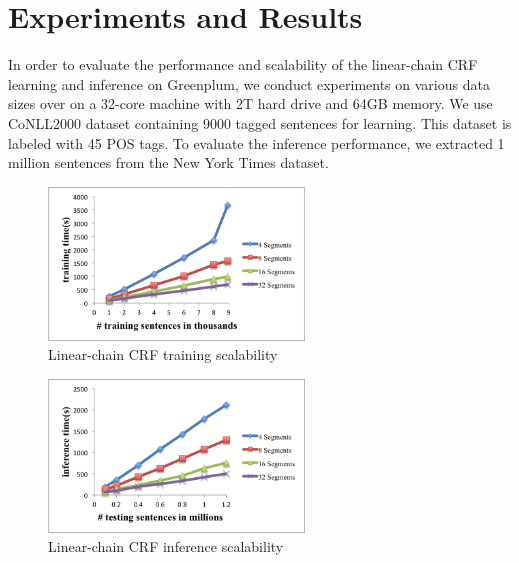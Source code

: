 \documentclass[11pt,letterpaper]{article}
\begin{document}




\section{Experiments and Results}
In order to evaluate the performance and scalability of the linear-chain CRF learning and inference on Greenplum,
we conduct experiments on various data sizes over on a 32-core machine with 2T hard drive and 64GB memory.
We use CoNLL2000 dataset containing 9000 tagged sentences for learning. 
This dataset is labeled with 45 POS tags.
To evaluate the inference performance, we extracted 1 million sentences from the New York Times dataset. 

\begin{figure}
\centering
\includegraphics[height=11em]{training}
\caption{Linear-chain CRF training scalability}
\label{fig:crftrain}
\end{figure}

\begin{figure}
\centering
\includegraphics[height=11em]{testing}
\caption{Linear-chain CRF inference scalability}
\label{fig:crftrain}
\end{figure}
\end{document}
